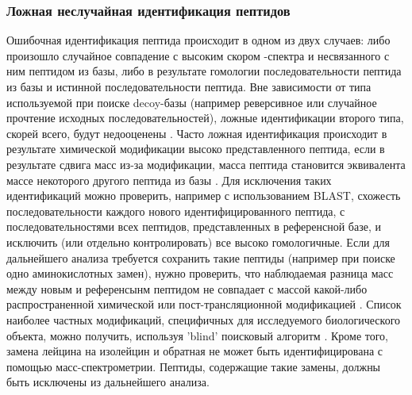 

\subsubsection{Ложная неслучайная идентификация пептидов}
Ошибочная идентификация пептида происходит в одном из двух случаев: либо произошло случайное совпадение с высоким скором  -спектра и несвязанного с ним пептидом из базы, либо в результате гомологии последовательности пептида из базы и истинной последовательности пептида. Вне зависимости от типа используемой при поиске decoy-базы (например реверсивное или случайное прочтение исходных последовательностей), ложные идентификации второго типа, скорей всего, будут недооценены \cite{nesvizhskii2010survey}. Часто ложная идентификация происходит в результате химической модификации высоко представленного пептида, если в результате сдвига масс из-за модификации, масса пептида становится эквивалента массе некоторого другого пептида из базы \cite{nesvizhskii2006dynamic, abraham2013moving}. Для исключения таких идентификаций можно проверить, например с использованием BLAST, схожесть последовательности каждого нового идентифицированного пептида, с последовательностями всех пептидов, представленных в референсной базе, и исключить (или отдельно контролировать) все высоко гомологичные. Если для дальнейшего анализа требуется сохранить такие пептиды (например при поиске одно аминокислотных замен), нужно проверить, что наблюдаемая разница масс между новым и референсынм пептидом не совпадает с массой какой-либо распространенной химической или пост-трансляционной модификацией \cite{li2011bioinformatics}. Список наиболее частных модификаций, специфичных для исследуемого биологического объекта, можно получить, используя 'blind' поисковый алгоритм \cite{tsur2005identification}. Кроме того, замена лейцина на изолейцин и обратная не может быть идентифицирована с помощью масс-спектрометрии. Пептиды, содержащие такие замены, должны быть исключены из дальнейшего анализа.

